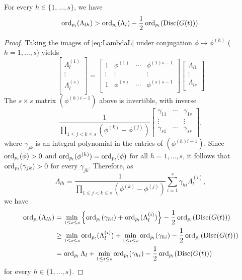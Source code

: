 \begin{lemma}\label{lem:DiscG}
For every $h \in \{1, \dots, s\}$, we have
\[\operatorname{ord}_{p_l}(\Lambda_{lh}) > \operatorname{ord}_{p_l}(\Lambda_l) - \frac{1}{2}\operatorname{ord}_{p_l}(\text{Disc}(G(t))).\]
\end{lemma}

\begin{proof}
Taking the images of \eqref{eq:LambdaL} under conjugation $\phi \mapsto \phi^{(h)}$ ($h = 1, \dots, s$) yields
\[\begin{bmatrix}
\Lambda_l^{(1)} \\
\vdots \\
\Lambda_l^{(s)}	\\
\end{bmatrix}
=
\begin{bmatrix}
1 		& \phi^{(1)} 	& \cdots 	& \phi^{(1)s-1}\\
\vdots 	& \vdots 		& 		& \vdots \\
1 		& \phi^{(s)} 	& \cdots  	& \phi^{(s)s-1}\\
\end{bmatrix}
\begin{bmatrix}
\Lambda_{l1}\\
\vdots \\
\Lambda_{ls}\\
\end{bmatrix}\]
The $s \times s$ matrix $(\phi^{(h)i-1})$ above is invertible, with inverse
\[\frac{1}{\displaystyle \prod_{1\leq j<k\leq s} (\phi^{(k)} - \phi^{(j)})}
\begin{bmatrix}
\gamma_{11} 	& \cdots 	& \gamma_{1s}\\
\vdots 		& 		& \vdots\\
\gamma_{s1} 	& \cdots 	& \gamma_{ss}\\
\end{bmatrix},\]
where $\gamma_{jk}$ is an integral polynomial in the entries of $(\phi^{(h)i-1})$. Since $\operatorname{ord}_{p_l}(\phi) > 0$ and $\operatorname{ord}_{p_l}(\phi^{(h)}) = \operatorname{ord}_{p_l}(\phi)$ for all $h = 1, \dots, s$, it follows that $\operatorname{ord}_{p_l}(\gamma_{jk}) > 0 $ for every $\gamma_{jk}$. Therefore, as 
\[\Lambda_{lh} = \frac{1}{\displaystyle \prod_{1\leq j<k\leq s}(\phi^{(k)} - \phi^{(j)})}\sum_{i = 1}^s \gamma_{hi}\Lambda_l^{(i)},\]
we have 
\begin{align*}
\operatorname{ord}_{p_l}(\Lambda_{lh}) 
	& = \min_{1 \leq i \leq s} \left\{\operatorname{ord}_{p_l}(\gamma_{hi}) + \operatorname{ord}_{p_l}(\Lambda_l^{(i)})\right\} -\frac{1}{2}\operatorname{ord}_{p_l}(\text{Disc}(G(t)))\\
	& \geq \min_{1 \leq i \leq s} \operatorname{ord}_{p_l}(\Lambda_l^{(i)}) +  \min_{1 \leq i \leq s} \operatorname{ord}_{p_l}(\gamma_{hi}) - \frac{1}{2}\operatorname{ord}_{p_l}(\text{Disc}(G(t)))\\
	& = \operatorname{ord}_{p_l}\Lambda_l + \min_{1 \leq i \leq s} \operatorname{ord}_{p_l}(\gamma_{hi}) - \frac{1}{2}\operatorname{ord}_{p_l}(\text{Disc}(G(t)))
\end{align*}
for every $h \in \{1, \dots, s\}$. 
\end{proof}

